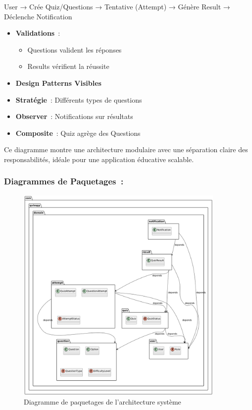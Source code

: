 \documentclass[12pt,a4paper,twoside,openright]{report}
\begin{document}
User → Crée Quiz/Questions → Tentative (Attempt) → Génère Result →
Déclenche Notification

\begin{itemize}
\item
  \textbf{Validations}~:

  \begin{itemize}
  \item
    Questions valident les réponses
  \item
    Results vérifient la réussite
  \end{itemize}
\end{itemize}

\begin{itemize}
\item
  \textbf{Design Patterns Visibles}
\end{itemize}

\begin{itemize}
\item
  \textbf{Stratégie}~: Différents types de questions
\item
  \textbf{Observer}~: Notifications sur résultats
\item
  \textbf{Composite}~: Quiz agrège des Questions
\end{itemize}

Ce diagramme montre une architecture modulaire avec une séparation
claire des responsabilités, idéale pour une application éducative
scalable.

\hypertarget{diagrammes-de-paquetages}{%
\subsubsection{Diagrammes de
Paquetages~:}\label{diagrammes-de-paquetages}}

\begin{figure}[H]
\centering
\includegraphics[width=0.9\textwidth]{latex_media/media/image17.png}
\caption{Diagramme de paquetages de l'architecture système}
\label{fig:diagramme-paquetages}
\end{figure}
\end{document}
